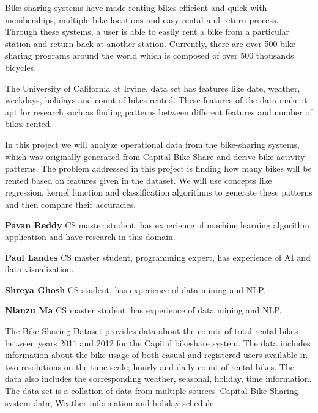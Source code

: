 \documentclass[12pt]{article}
\author{\theauthor}
\newcommand{\ci}[1]{\cite{#1}}
\begin{document}
\maketitle



Bike sharing systems have made renting bikes efficient and quick with
memberships, multiple bike locations and easy rental and return
process. Through these systems, a user is able to easily rent a bike from a
particular station and return back at another station. Currently, there are
over 500 bike-sharing programs around the world which is composed of over 500
thousands bicycles\ci{ucibikeshare}.


The University of California at Irvine, data set has features like date,
weather, weekdays, holidays and count of bikes rented. These features of the
data make it apt for research such as finding patterns between different
features and number of bikes rented.

In this project we will analyze operational data from the bike-sharing systems,
which was originally generated from Capital Bike Share and derive bike activity
patterns. The problem addressed in this project is finding how many bikes will
be rented based on features given in the dataset. We will use concepts like
regression, kernel function and classification algorithms to generate these
patterns and then compare their accuracies.

{\bf Pavan Reddy} CS master student, has experience of machine learning
algorithm application and have research in this domain.

\noindent
{\bf Paul Landes} CS master student, programming expert, has experience of AI
and data visualization.

\noindent
{\bf Shreya Ghosh} CS student, has experience of data mining and NLP.

\noindent
{\bf Nianzu Ma} CS master student, has experience of data mining and NLP.



The Bike Sharing Dataset provides data about the counts of total rental bikes
between years 2011 and 2012 for the Capital bikeshare system. The data includes
information about the bike usage of both casual and registered users available
in two resolutions on the time scale; hourly and daily count of rental
bikes. The data also includes the corresponding weather, seasonal, holiday,
time information. The data set is a collation of data from multiple
sources--Capital Bike Sharing system data\ci{capbikeshare}, Weather
information\ci{freemeteo} and holiday schedule\ci{holiday}.
\end{document}
